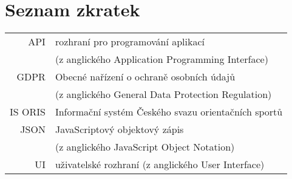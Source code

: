 \documentclass[czech,bachelor,unicode]{ctufit-thesis}
\theoremstyle{plain}
\theoremstyle{definition}
\theoremstyle{remark}
\numberwithin{theorem}{chapter}
\begin{document}
% 
% 
% 
% 
% 
% 
% 
% 
% 

\chapter{Seznam zkratek}
	
\begin{tabular}{rl}
API & rozhraní pro programování aplikací\\
    & (z anglického Application Programming Interface)\\
GDPR & Obecné nařízení o ochraně osobních údajů\\
	 & (z anglického General Data Protection Regulation)\\
IS ORIS & Informační systém Českého svazu orientačních sportů\\
JSON & JavaScriptový objektový zápis\\
     & (z anglického JavaScript Object Notation)\\
UI & uživatelské rozhraní (z anglického User Interface)
\end{tabular}
\end{document}
